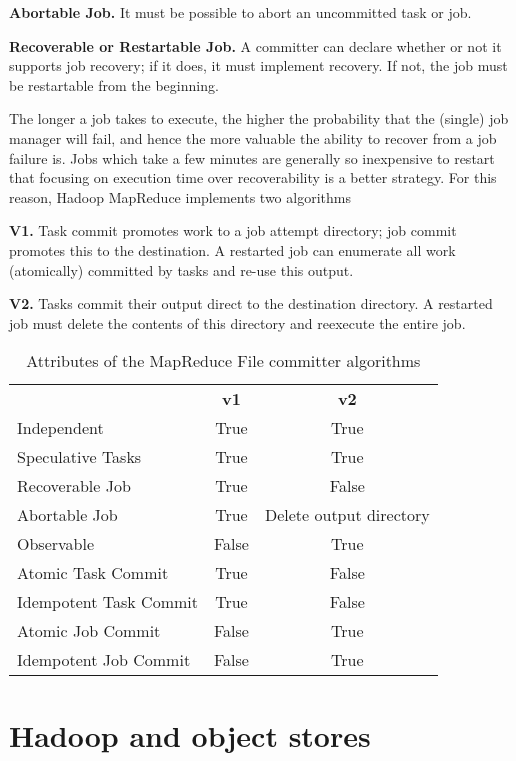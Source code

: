 \documentclass[9pt,technote]{IEEEtran}
\begin{document}
\textbf{Abortable Job.}
It must be possible to abort an uncommitted task or job.

\textbf{Recoverable or Restartable Job.}
A committer can declare whether or not it supports job recovery;
if it does, it must implement recovery.
If not, the job must be restartable from the beginning.

The longer a job takes to execute, the higher the probability that the (single)
job manager will fail, and hence the more valuable the ability to recover from
a job failure is.
Jobs which take a few minutes are generally so inexpensive to
restart that focusing on execution time over recoverability is a better strategy.
For this reason, Hadoop MapReduce implements two algorithms


\textbf{V1.}
Task commit promotes work to a job attempt directory;
job commit promotes this to the destination.
A restarted job can enumerate all work (atomically)
committed by tasks and re-use this output.

\textbf{V2.}
Tasks commit their output direct to the destination directory.
A restarted job must delete the contents of this directory and reexecute
the entire job.

\begin{table}
  \label{tab:file-committer-attributes}
  \begin{tabular}{ l c c }
    \hline
    & \textbf{v1} & \textbf{v2} \\
    Independent & True & True \\
    Speculative Tasks & True & True \\
    Recoverable Job & True & False \\
    Abortable Job & True & Delete output directory \\
    Observable & False & True \\
    Atomic Task Commit & True & False \\
    Idempotent Task Commit & True & False \\
    Atomic Job Commit & False & True \\
    Idempotent Job Commit & False & True \\
    \hline
  \end{tabular}
  \caption{Attributes of the MapReduce File committer algorithms}
\end{table}


\section{Hadoop and object stores}
\label{sec:object-stores}
\end{document}
